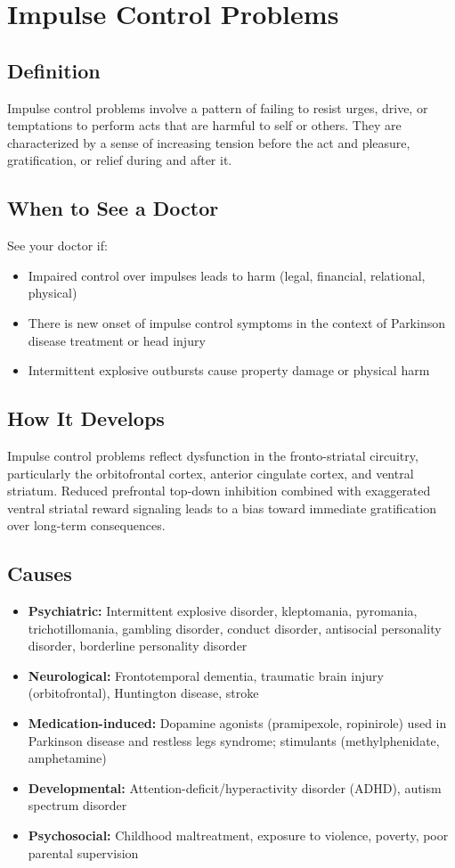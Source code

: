 \chapter{Impulse Control Problems}

\section*{Definition}
Impulse control problems involve a pattern of failing to resist urges, drive, or temptations to perform acts that are harmful to self or others. They are characterized by a sense of increasing tension before the act and pleasure, gratification, or relief during and after it.

\section*{When to See a Doctor}
See your doctor if:
\begin{itemize}
  \item Impaired control over impulses leads to harm (legal, financial, relational, physical)
  \item There is new onset of impulse control symptoms in the context of Parkinson disease treatment or head injury
  \item Intermittent explosive outbursts cause property damage or physical harm
\end{itemize}

\section*{How It Develops}
Impulse control problems reflect dysfunction in the fronto-striatal circuitry, particularly the orbitofrontal cortex, anterior cingulate cortex, and ventral striatum. Reduced prefrontal top-down inhibition combined with exaggerated ventral striatal reward signaling leads to a bias toward immediate gratification over long-term consequences.

\section*{Causes}
\begin{itemize}
  \item \textbf{Psychiatric:} Intermittent explosive disorder, kleptomania, pyromania, trichotillomania, gambling disorder, conduct disorder, antisocial personality disorder, borderline personality disorder
  \item \textbf{Neurological:} Frontotemporal dementia, traumatic brain injury (orbitofrontal), Huntington disease, stroke
  \item \textbf{Medication-induced:} Dopamine agonists (pramipexole, ropinirole) used in Parkinson disease and restless legs syndrome; stimulants (methylphenidate, amphetamine)
  \item \textbf{Developmental:} Attention-deficit/hyperactivity disorder (ADHD), autism spectrum disorder
  \item \textbf{Psychosocial:} Childhood maltreatment, exposure to violence, poverty, poor parental supervision
\end{itemize}

